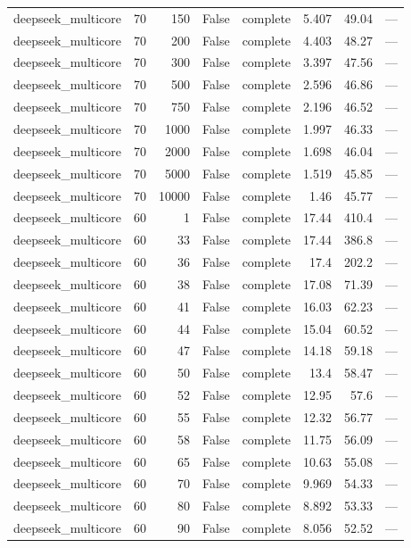 \begin{tabular}{lrrrlrrl}
deepseek\_multicore & 70 & 150 & False & complete & 5.407 & 49.04 & — \\
deepseek\_multicore & 70 & 200 & False & complete & 4.403 & 48.27 & — \\
deepseek\_multicore & 70 & 300 & False & complete & 3.397 & 47.56 & — \\
deepseek\_multicore & 70 & 500 & False & complete & 2.596 & 46.86 & — \\
deepseek\_multicore & 70 & 750 & False & complete & 2.196 & 46.52 & — \\
deepseek\_multicore & 70 & 1000 & False & complete & 1.997 & 46.33 & — \\
deepseek\_multicore & 70 & 2000 & False & complete & 1.698 & 46.04 & — \\
deepseek\_multicore & 70 & 5000 & False & complete & 1.519 & 45.85 & — \\
deepseek\_multicore & 70 & 10000 & False & complete & 1.46 & 45.77 & — \\
deepseek\_multicore & 60 & 1 & False & complete & 17.44 & 410.4 & — \\
deepseek\_multicore & 60 & 33 & False & complete & 17.44 & 386.8 & — \\
deepseek\_multicore & 60 & 36 & False & complete & 17.4 & 202.2 & — \\
deepseek\_multicore & 60 & 38 & False & complete & 17.08 & 71.39 & — \\
deepseek\_multicore & 60 & 41 & False & complete & 16.03 & 62.23 & — \\
deepseek\_multicore & 60 & 44 & False & complete & 15.04 & 60.52 & — \\
deepseek\_multicore & 60 & 47 & False & complete & 14.18 & 59.18 & — \\
deepseek\_multicore & 60 & 50 & False & complete & 13.4 & 58.47 & — \\
deepseek\_multicore & 60 & 52 & False & complete & 12.95 & 57.6 & — \\
deepseek\_multicore & 60 & 55 & False & complete & 12.32 & 56.77 & — \\
deepseek\_multicore & 60 & 58 & False & complete & 11.75 & 56.09 & — \\
deepseek\_multicore & 60 & 65 & False & complete & 10.63 & 55.08 & — \\
deepseek\_multicore & 60 & 70 & False & complete & 9.969 & 54.33 & — \\
deepseek\_multicore & 60 & 80 & False & complete & 8.892 & 53.33 & — \\
deepseek\_multicore & 60 & 90 & False & complete & 8.056 & 52.52 & — \\

\end{tabular}
